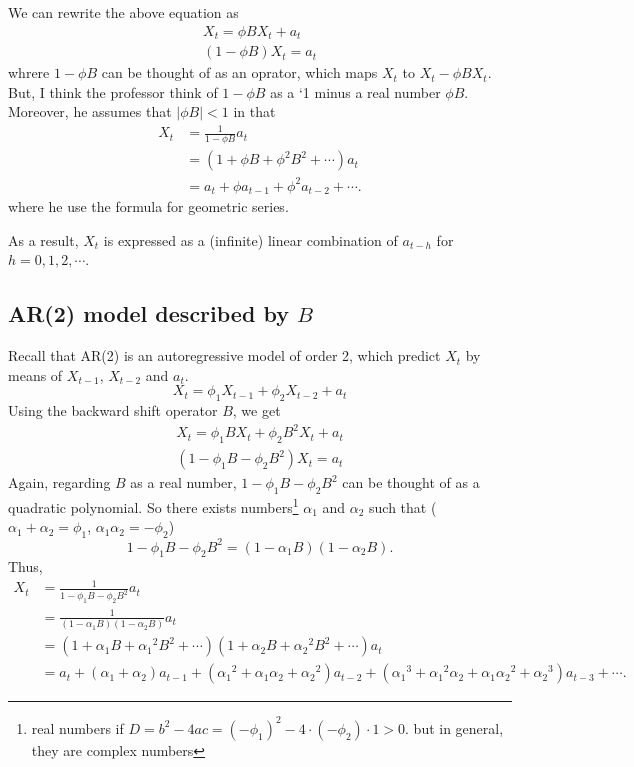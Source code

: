 \documentclass{article}
\newcommand\ar{\ensuremath{\text{AR}}}
\begin{document}
We can rewrite the above equation as
\begin{gather*}
X_t=\phi B X_t+a_t\\
(1-\phi B)X_t=a_t
\end{gather*}
whrere \(1-\phi B\) can be thought of as an oprator, which maps \(X_t\) to \(X_t-\phi BX_t\).
But, I think the professor think of \(1-\phi B\) as a `1 minus a real number \(\phi B\).
Moreover, he assumes that \(|\phi B|<1\) in that
\begin{equation}\label{geomteric_series}
\begin{aligned}
X_t
&=\frac1{1-\phi B}a_t\\
&=(1+\phi B+\phi^2B^2+\cdots)a_t\\
&=a_t+\phi a_{t-1}+\phi^2a_{t-2}+\cdots.
\end{aligned}
\end{equation}
where he use the formula for geometric series.

As a result, \(X_t\) is expressed as a (infinite) linear combination of \(a_{t-h}\) for \(h=0,1,2,\cdots\).

%
\subsection{AR(2) model described by \(B\)}
Recall that \ar(2) is an autoregressive model of order 2, which predict \(X_t\) by means of \(X_{t-1}\), \(X_{t-2}\) and \(a_t\).
\begin{equation}\label{ar2}
X_t=\phi_1X_{t-1}+\phi_2X_{t-2}+a_t
\end{equation}
Using the backward shift operator \(B\), we get 
\begin{gather*}
X_t=\phi_1BX_t+\phi_2B^2X_t+a_t\\
(1-\phi_1B-\phi_2B^2)X_t=a_t
\end{gather*}
Again, regarding \(B\) as a real number, \(1-\phi_1B-\phi_2B^2\) can be thought of as a quadratic polynomial.
So there exists numbers\footnote{real numbers if \(D=b^2-4ac=(-\phi_1)^2-4\cdot(-\phi_2)\cdot1>0\). but in general, they are complex numbers} \(\alpha_1\) and \(\alpha_2\) such that (\(\alpha_1+\alpha_2=\phi_1\), \(\alpha_1\alpha_2=-\phi_2\))
\[1-\phi_1B-\phi_2B^2=(1-\alpha_1B)(1-\alpha_2B).\]
Thus,
\begin{align*}
X_t
&=\frac1{1-\phi_1B-\phi_2B^2}a_t\\
&=\frac1{(1-\alpha_1B)(1-\alpha_2B)}a_t\\
&=(1+\alpha_1B+{\alpha_1}^2B^2+\cdots)(1+\alpha_2B+{\alpha_2}^2B^2+\cdots)a_t\\
&=a_t+(\alpha_1+\alpha_2)a_{t-1}+({\alpha_1}^2+\alpha_1\alpha_2+{\alpha_2}^2)a_{t-2}
+({\alpha_1}^3+{\alpha_1}^2\alpha_2+\alpha_1{\alpha_2}^2+{\alpha_2}^3)a_{t-3}+\cdots.
\end{align*}
\end{document}
